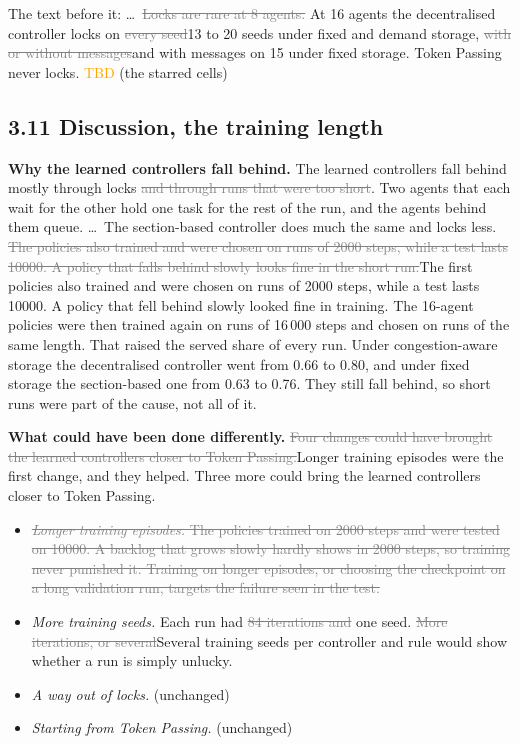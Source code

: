 \documentclass[11pt,a4paper]{article}
\newcommand{\new}[1]{\textcolor{newc}{#1}}
\newcommand{\old}[1]{\textcolor{gray}{\sout{#1}}}
\newcommand{\tbd}{\textcolor{orange}{TBD}}
\begin{document}
The text before it: \dots\ \old{Locks are rare at 8 agents.} At 16 agents
the decentralised controller locks on \old{every seed}\new{13 to 20 seeds}
under fixed and demand storage, \old{with or without messages}\new{and with
messages on 15 under fixed storage}. Token Passing never locks. \tbd{} (the
starred cells)

\subsection*{3.11 Discussion, the training length}

\textbf{Why the learned controllers fall behind.} The learned controllers
fall behind mostly through locks\old{ and through runs that were too
short}. Two agents that each wait for the other hold one task for the rest
of the run, and the agents behind them queue. \dots\ The section-based
controller does much the same and locks less. \old{The policies also
trained and were chosen on runs of 2000 steps, while a test lasts 10000. A
policy that falls behind slowly looks fine in the short run.}\new{The first
policies also trained and were chosen on runs of 2000 steps, while a test
lasts 10000. A policy that fell behind slowly looked fine in training. The
16-agent policies were then trained again on runs of 16\,000 steps and
chosen on runs of the same length. That raised the served share of every
run. Under congestion-aware storage the decentralised controller went from
0.66 to 0.80, and under fixed storage the section-based one from 0.63 to
0.76. They still fall behind, so short runs were part of the cause, not all
of it.}

\textbf{What could have been done differently.} \old{Four changes could
have brought the learned controllers closer to Token Passing.}\new{Longer
training episodes were the first change, and they helped. Three more could
bring the learned controllers closer to Token Passing.}
\begin{itemize}[leftmargin=1.2em]
\item \old{\emph{Longer training episodes.} The policies trained on 2000
  steps and were tested on 10000. A backlog that grows slowly hardly shows in
  2000 steps, so training never punished it. Training on longer episodes, or
  choosing the checkpoint on a long validation run, targets the failure seen
  in the test.}
\item \emph{More training \new{seeds}.} Each run had \old{84 iterations
  and} one seed. \old{More iterations, or several}\new{Several} training
  seeds per controller and rule would show whether a run is simply unlucky.
\item \emph{A way out of locks.} (unchanged)
\item \emph{Starting from Token Passing.} (unchanged)
\end{itemize}
\end{document}
